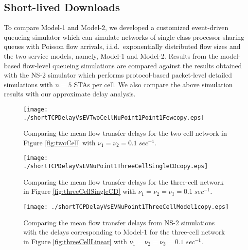 \documentclass[10pt,a4paper,journal]{IEEEtran}
\theoremstyle{definition}
\theoremstyle{remark}
\theoremstyle{plain}
\begin{document}
\subsection{Short-lived Downloads}
\label{subsec:results-TCP-short}

To compare Model-1 and Model-2, we developed a customized event-driven queueing simulator which can simulate networks of single-class processor-sharing queues with Poisson flow arrivals, i.i.d.~exponentially distributed flow sizes and the two service models, namely, Model-1 and Model-2. Results from the model-based flow-level queueing simulations are compared against the results obtained with the NS-2 simulator \cite{wanet.ns2} which performs protocol-based packet-level detailed simulations with $n = 5$ STAs per cell. We also compare the above simulation results with our approximate delay analysis. 


\begin{figure}[tb]
  \centering
  \begin{minipage}{8.25cm}
  \begin{center}
    \texttt{[image: ./shortTCPDelayVsEVTwoCellNuPoint1Point1Fewcopy.eps]}
     \caption{Comparing the mean flow transfer delays for the two-cell
       network in Figure \ref{fig:twoCell} with $\nu_1 = \nu_2 = 0.1
       \; sec^{-1}$. \label{fig:shortTCPDelayVsEVTwoCellNuPoint1Point1Few}}
     \vspace{3mm}
  \end{center}
  \end{minipage}
\begin{minipage}{8.25cm}
  \begin{center}
    \texttt{[image: ./shortTCPDelayVsEVNuPoint1ThreeCellSingleCDcopy.eps]}
     \caption{Comparing the mean flow transfer delays for the
       three-cell network in Figure \ref{fig:threeCellSingleCD} with
       $\nu_1 = \nu_2 = \nu_3 = 0.1 \; sec^{-1}$. \label{fig:shortTCPDelayVsEVNuPoint1ThreeCellSingleCD}}
     \vspace{3mm}
  \end{center}
  \end{minipage}
  \begin{minipage}{8.25cm}
    \begin{center}
      \texttt{[image: ./shortTCPDelayVsEVNuPoint1ThreeCellModel1copy.eps]}
     \caption{Comparing the mean flow transfer delays from
       NS-2 simulations with the delays corresponding to Model-1 for
       the three-cell network in Figure \ref{fig:threeCellLinear}
       with $\nu_1 = \nu_2 = \nu_3 = 0.1 \;
       sec^{-1}$. \label{fig:shortTCPDelayVsEVNuPoint1ThreeCellLinearModel1}}
\end{center}
  \end{minipage}
\end{figure}
\end{document}
